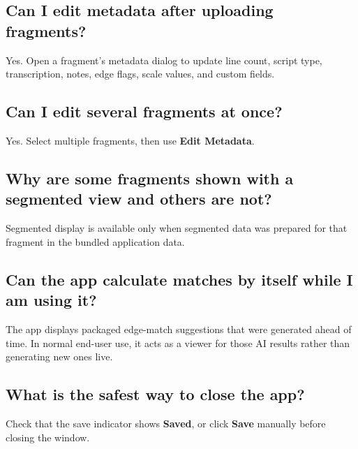 \documentclass[12pt]{article}
\begin{document}
\subsection{Can I edit metadata after uploading fragments?}
Yes. Open a fragment's metadata dialog to update line count, script type, transcription, notes, edge flags, scale values, and custom fields.

\subsection{Can I edit several fragments at once?}
Yes. Select multiple fragments, then use \textbf{Edit Metadata}.

\subsection{Why are some fragments shown with a segmented view and others are not?}
Segmented display is available only when segmented data was prepared for that fragment in the bundled application data.

\subsection{Can the app calculate matches by itself while I am using it?}
The app displays packaged edge-match suggestions that were generated ahead of time. In normal end-user use, it acts as a viewer for those AI results rather than generating new ones live.

\subsection{What is the safest way to close the app?}
Check that the save indicator shows \textbf{Saved}, or click \textbf{Save} manually before closing the window.
\end{document}
